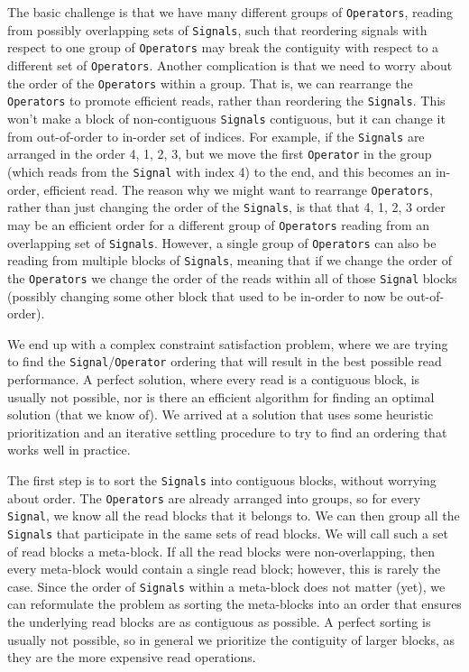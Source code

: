 \documentclass{article}
\begin{document}
The basic challenge is that we have many different groups of \texttt{Operators}, reading from possibly overlapping sets of \texttt{Signals}, such that reordering signals with respect to one group of \texttt{Operators} may break the contiguity with respect to a different set of \texttt{Operators}.  Another complication is that we need to worry about the order of the \texttt{Operators} within a group. That is, we can rearrange the \texttt{Operators} to promote efficient reads, rather than reordering the \texttt{Signals}.  This won't make a block of non-contiguous \texttt{Signals} contiguous, but it can change it from out-of-order to in-order set of indices.  For example, if the \texttt{Signals} are arranged in the order 4, 1, 2, 3, but we move the first \texttt{Operator} in the group (which reads from the \texttt{Signal} with index 4) to the end, and this becomes an in-order, efficient read.  The reason why we might want to rearrange \texttt{Operators}, rather than just changing the order of the \texttt{Signals}, is that that 4, 1, 2, 3 order may be an efficient order for a different group of \texttt{Operators} reading from an overlapping set of \texttt{Signals}.  However, a single group of \texttt{Operators} can also be reading from multiple blocks of \texttt{Signals}, meaning that if we change the order of the \texttt{Operators} we change the order of the reads within all of those \texttt{Signal} blocks (possibly changing some other block that used to be in-order to now be out-of-order).

We end up with a complex constraint satisfaction problem, where we are trying to find the \texttt{Signal}/\texttt{Operator} ordering that will result in the best possible read performance. A perfect solution, where every read is a contiguous block, is usually not possible, nor is there an efficient algorithm for finding an optimal solution (that we know of).  We arrived at a solution that uses some heuristic prioritization and an iterative settling procedure to try to find an ordering that works well in practice.  

The first step is to sort the \texttt{Signals} into contiguous blocks, without worrying about order.  The \texttt{Operators} are already arranged into groups, so for every \texttt{Signal}, we know all the read blocks that it belongs to.  We can then group all the \texttt{Signals} that participate in the same sets of read blocks.  We will call such a set of read blocks a meta-block.  If all the read blocks were non-overlapping, then every meta-block would contain a single read block; however, this is rarely the case.  Since the order of \texttt{Signals} within a meta-block does not matter (yet), we can reformulate the problem as sorting the meta-blocks into an order that ensures the underlying read blocks are as contiguous as possible.  A perfect sorting is usually not possible, so in general we prioritize the contiguity of larger blocks, as they are the more expensive read operations.
\end{document}
